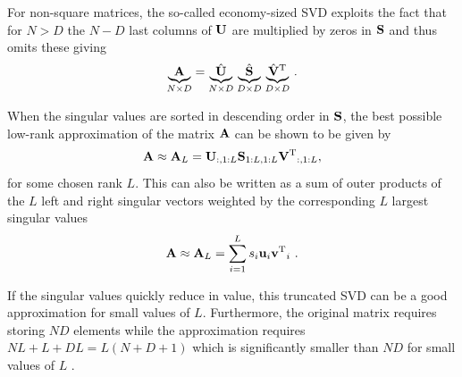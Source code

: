 For non-square matrices, the so-called economy-sized \gls{SVD} exploits the fact that for $N>D$ the $N-D$ last columns of $\U$ are multiplied by zeros in $\S$ and thus omits these giving
\begin{equation}
    \underset{N\times D}{\underbrace{\A}} = \underset{N\times D}{\underbrace{\hat{\U}}}\;\underset{D\times D}{\underbrace{\hat{\S}}}\;\underset{D\times D}{\underbrace{\hat{\V}\transpose}} \ .
\end{equation}

When the singular values are sorted in descending order in $\S$, the best possible low-rank approximation of the matrix $\A$ can be shown to be given by
\begin{equation}
    \A \approx \A_L = \U_{:,1:L}\S_{1:L,1:L}\V\transpose_{:,1:L},
\end{equation}
for some chosen rank $L$. This can also be written as a sum of outer products of the $L$ left and right singular vectors weighted by the corresponding $L$ largest singular values
\begin{equation}
    \A \approx \A_L = \sum_{i=1}^L s_i \u_i\v\transpose_i \ .
\end{equation}

If the singular values quickly reduce in value, this truncated SVD can be a good approximation for small values of $L$. Furthermore, the original matrix requires storing $ND$ elements while the approximation requires $NL+L+DL=L(N+D+1)$ which is significantly smaller than $ND$ for small values of $L$ \cite{Murphy2012}.

